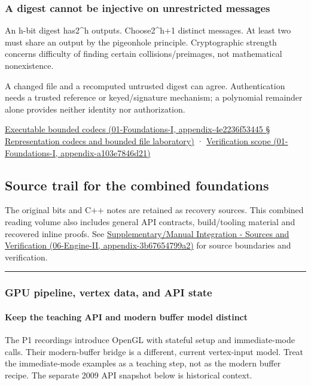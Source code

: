 \subsubsection{A digest cannot be injective on unrestricted messages}\label{a-digest-cannot-be-injective-on-unrestricted-messages}

An h-bit digest has2\^{}h outputs. Choose2\^{}h+1 distinct messages. At least two must share an output by the pigeonhole principle. Cryptographic strength concerns difficulty of finding certain collisions/preimages, not mathematical nonexistence.

A changed file and a recomputed untrusted digest can agree. Authentication needs a trusted reference or keyed/signature mechanism; a polynomial remainder alone provides neither identity nor authorization.

\href{}{Executable bounded codecs (01-Foundations-I, appendix-4e2236f53445 § Representation codecs and bounded file laboratory)} · \href{}{Verification scope (01-Foundations-I, appendix-a103e7846d21)}

\subsection{Source trail for the combined foundations}\label{source-trail-for-the-combined-foundations}

The original bits and C++ notes are retained as recovery sources. This combined reading volume also includes general API contracts, build/tooling material and recovered inline proofs. See \href{}{Supplementary/Manual Integration - Sources and Verification (06-Engine-II, appendix-3b67654799a2)} for source boundaries and verification.

\begin{center}\rule{0.5\linewidth}{0.5pt}\end{center}

\subsubsection{GPU pipeline, vertex data, and API state}\label{gpu-pipeline-vertex-data-and-api-state}

\paragraph{Keep the teaching API and modern buffer model distinct}\label{keep-the-teaching-api-and-modern-buffer-model-distinct}

The P1 recordings introduce OpenGL with stateful setup and immediate-mode calls. Their modern-buffer bridge is a different, current vertex-input model. Treat the immediate-mode examples as a teaching step, not as the modern buffer recipe. The separate 2009 API snapshot below is historical context.

